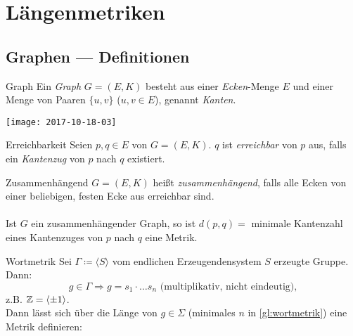 \chapter{Längenmetriken}

\section{Graphen --- Definitionen}

\begin{definition}{Graph}
  Ein \emph{Graph} $ G = (E, K) $ besteht aus einer \emph{Ecken}-Menge $ E $ und einer Menge von Paaren $ \{ u, v \} $ ($ u, v \in E $), genannt \emph{Kanten}.
\end{definition}

\begin{marginfigure}
    \texttt{[image: 2017-10-18-03]}
    \caption{Ein einfacher Graph. Dieser Graph ist \underline{nicht} zusammenhängend, da die Ecke $ 1 $ nicht von den anderen Ecken aus erreicht werden kann.}
\end{marginfigure}

\begin{definition}{Erreichbarkeit}
  Seien $ p, q \in E $ von $ G = (E, K) $. $ q $ ist \emph{erreichbar} von $ p $ aus, falls ein \emph{Kantenzug} von $ p $ nach $ q $ existiert.
\end{definition}

\begin{definition}{Zusammenhängend}
  $ G = (E, K) $ heißt \emph{zusammenhängend}, falls alle Ecken von einer beliebigen, festen Ecke aus erreichbar sind.
  \\ \ \\
  Ist $ G $ ein zusammenhängender Graph, so ist $ d(p, q) = $ minimale Kantenzahl eines Kantenzuges von $ p $ nach $ q $ eine Metrik.
\end{definition}

\begin{example}{Wortmetrik}
  Sei $ \Gamma \coloneqq \langle S \rangle $ vom endlichen Erzeugendensystem $ S $ erzeugte Gruppe. Dann:
  \begin{equation}
    \label{gl:wortmetrik}
    g \in \Gamma \Rightarrow g = s_1\cdot \dots s_n\text{ (multiplikativ, nicht eindeutig),}
  \end{equation}
  z.B. $ \mathbb{Z} = \langle \pm 1 \rangle $. \\
  Dann lässt sich über die Länge von $ g \in \Sigma $ (minimales $ n $ in \autoref{gl:wortmetrik}) eine Metrik definieren:
\end{example}

